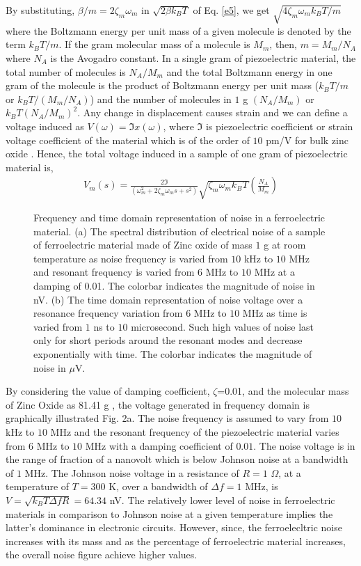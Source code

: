 \documentclass[12pt,column,showpacs,pre,preprintnumbers,amsmath,amssymb,aps,standalone]{revtex4-2}
\begin{document}
By substituting, $\beta/m=2\zeta_m\omega_m$ in $\sqrt{2\beta k_BT}$  of Eq. \ref{e5}, we get $\sqrt{4\zeta_m\omega_mk_BT/m}$ where the Boltzmann energy per unit mass of a given molecule is denoted by the term $k_BT/m$. If the gram molecular mass of a molecule is $M_m$, then, $m=M_m/N_A$ where $N_A$ is the Avogadro constant. In a single gram of piezoelectric material, the total number of molecules is $N_A/M_m$ and the total Boltzmann energy in one gram of the molecule is the product of Boltzmann energy per unit mass ($k_BT/m$ or $k_BT/(M_m/N_A)$) and the number of molecules in $1$ g $(N_A/M_m)$ or $k_BT(N_A/M_m)^2$. Any change in displacement causes strain and we can define a voltage induced as $V(\omega)=\Im x(\omega)$, where $\Im$  is piezoelectric coefficient or strain voltage coefficient of the material which is of the order of $10$ pm/V for bulk zinc oxide \cite{21}. Hence, the total voltage induced in a sample of one gram of piezoelectric material is,
\begin{align} \label{e10}
V_m(s)=\frac{2\Im}{(\omega_m^2+2\zeta_m \omega_ms+s^2)}\sqrt{\zeta_m \omega_m k_BT}\left(\frac{N_A}{M_m}\right)  
\end{align}  
\begin{figure}[htbp]
	  
	\label{fig2}
	\caption{\small Frequency and time domain representation of noise in a ferroelectric material. (a) The spectral distribution of electrical noise of a sample of ferroelectric material made of Zinc oxide of mass $ 1 $ g at room temperature as noise frequency is varied from $10$ kHz to $10$ MHz and resonant frequency is varied from $ 6 $ MHz to $ 10 $ MHz at a damping of 0.01. The colorbar indicates the magnitude of noise in nV. (b) The time domain representation of noise voltage over a resonance frequency variation from $6$ MHz to $10$ MHz as time is varied from $ 1 $ ns to $ 10 $ microsecond. Such high values of noise last only for short periods around the resonant modes and decrease exponentially with time. The colorbar indicates the magnitude of noise in $\mu$V.}
\end{figure}By considering the value of damping coefficient, $\zeta$=0.01, and the molecular mass of Zinc Oxide as 81.41 g \cite{16}, the voltage generated in frequency domain is graphically illustrated Fig. 2a. The noise frequency is assumed to vary from $10$ kHz to $10$ MHz and the resonant frequency of the piezoelectric material varies from 
 $ 6 $ MHz to $ 10 $ MHz with a damping coefficient of $0.01$. The noise voltage is in the range of fraction of a nanovolt which is below Johnson noise at a bandwidth of $1$ MHz. The Johnson noise voltage in a resistance of $R=1 $ $\Omega$, at a temperature of $T=300$ K, over a bandwidth of $\Delta f=1  $ MHz, is $ V=\sqrt{k_BT\Delta f R} =64.34$ nV. The relatively lower level of noise in ferroelectric materials in comparison to Johnson noise at a given temperature implies the latter's dominance in electronic circuits. However, since, the ferroelecltric noise increases with its mass and as the percentage of ferroelectric material increases, the overall noise figure achieve higher values.
  
\end{document}
